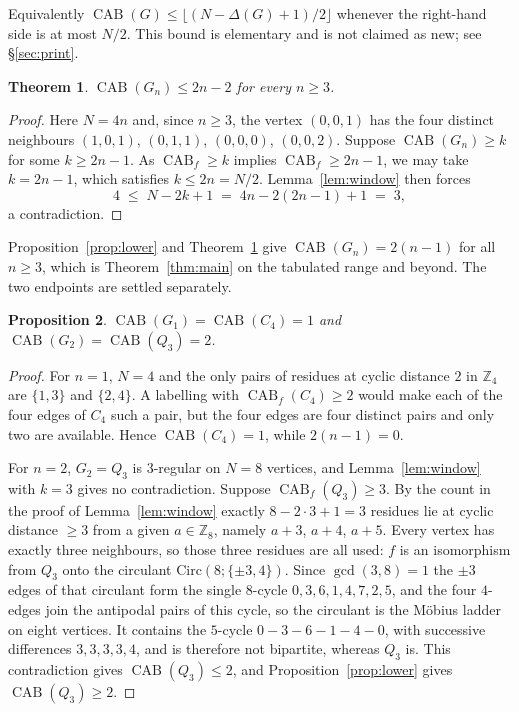 \documentclass[11pt]{amsart}
\newtheorem{theorem}{Theorem}
\newtheorem{proposition}[theorem]{Proposition}
\DeclareMathOperator{\CAB}{CAB}
\begin{document}
Equivalently $\CAB(G)\le\lfloor(N-\Delta(G)+1)/2\rfloor$ whenever the right-hand side is at most
$N/2$. This bound is elementary and is not claimed as new; see \S\ref{sec:print}.

\begin{theorem}\label{thm:upper}
$\CAB(G_n)\le 2n-2$ for every $n\ge3$.
\end{theorem}

\begin{proof}
Here $N = 4n$ and, since $n\ge3$, the vertex $(0,0,1)$ has the four distinct neighbours
$(1,0,1)$, $(0,1,1)$, $(0,0,0)$, $(0,0,2)$. Suppose $\CAB(G_n)\ge k$ for some $k\ge 2n-1$. As
$\CAB_f\ge k$ implies $\CAB_f\ge 2n-1$, we may take $k = 2n-1$, which satisfies
$k\le 2n = N/2$. Lemma~\ref{lem:window} then forces
\[
  4 \;\le\; N-2k+1 \;=\; 4n - 2(2n-1) + 1 \;=\; 3,
\]
a contradiction.
\end{proof}

Proposition~\ref{prop:lower} and Theorem~\ref{thm:upper} give
$\CAB(G_n) = 2(n-1)$ for all $n\ge3$, which is Theorem~\ref{thm:main} on the tabulated range and
beyond. The two endpoints are settled separately.

\begin{proposition}\label{prop:ends}
$\CAB(G_1) = \CAB(C_4) = 1$ and $\CAB(G_2) = \CAB(Q_3) = 2$.
\end{proposition}

\begin{proof}
For $n=1$, $N=4$ and the only pairs of residues at cyclic distance $2$ in $\mathbb{Z}_4$ are
$\{1,3\}$ and $\{2,4\}$. A labelling with $\CAB_f(C_4)\ge2$ would make each of the four edges of
$C_4$ such a pair, but the four edges are four distinct pairs and only two are available. Hence
$\CAB(C_4)=1$, while $2(n-1)=0$.

For $n=2$, $G_2 = Q_3$ is $3$-regular on $N=8$ vertices, and Lemma~\ref{lem:window} with $k=3$
gives no contradiction. Suppose $\CAB_f(Q_3)\ge3$. By the count in the proof of
Lemma~\ref{lem:window} exactly $8-2\cdot3+1 = 3$ residues lie at cyclic distance $\ge3$ from a
given $a\in\mathbb{Z}_8$, namely $a+3$, $a+4$, $a+5$. Every vertex has exactly three neighbours, so
those three residues are all used: $f$ is an isomorphism from $Q_3$ onto the circulant
$\mathrm{Circ}(8;\{\pm3,4\})$. Since $\gcd(3,8)=1$ the $\pm3$ edges of that circulant form the
single $8$-cycle $0,3,6,1,4,7,2,5$, and the four $4$-edges join the antipodal pairs of this cycle,
so the circulant is the M\"obius ladder on eight vertices. It contains the $5$-cycle
$0-3-6-1-4-0$, with successive differences $3,3,3,3,4$, and is therefore not bipartite, whereas
$Q_3$ is. This contradiction gives $\CAB(Q_3)\le2$, and Proposition~\ref{prop:lower} gives
$\CAB(Q_3)\ge2$.
\end{proof}
\end{document}
